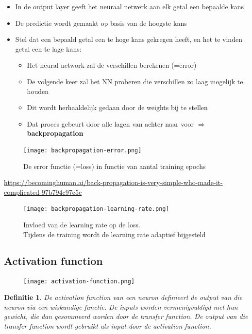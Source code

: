 \documentclass{article}
\newtheorem{theorem}{Definitie}[section]
\begin{document}
\begin{itemize}
    \item In de output layer geeft het neuraal netwerk aan elk getal een bepaalde kans
    \item De predictie wordt gemaakt op basis van de hoogste kans
    \item Stel dat een bepaald getal een te hoge kans gekregen heeft, en het te vinden getal een te lage kans:
    \begin{itemize}
        \item Het neural network zal de verschillen berekenen (=error)
        \item De volgende keer zal het NN proberen die verschillen zo laag mogelijk te houden
        \item Dit wordt herhaaldelijk gedaan door de weights bij te stellen
        \item Dat proces gebeurt door alle lagen van achter naar voor $\Rightarrow$ \textbf{backpropagation}
    \end{itemize}
\end{itemize}

\begin{figure}[H]
    \centering
    \texttt{[image: backpropagation-error.png]}
    \caption{De error functie (=loss) in functie van aantal training epochs}
\end{figure}

\url{https://becominghuman.ai/back-propagation-is-very-simple-who-made-it-complicated-97b794c97e5c}

\begin{figure}[H]
    \centering
    \texttt{[image: backpropagation-learning-rate.png]}
    \caption{Invloed van de learning rate op de loss.\\ Tijdens de training wordt de learning rate adaptief bijgesteld}
\end{figure}

\subsection{Activation function}

\begin{figure}[H]
    \centering
    \texttt{[image: activation-function.png]}
\end{figure}


\begin{theorem}
    De activation function van een neuron definieert de output van die neuron via een wiskundige functie. 
    De inputs worden vermenigvuldigd met hun gewicht, die dan gesommeerd worden door de transfer function. 
    De output van die transfer function wordt gebruikt als input door de activation function.
\end{theorem}
\end{document}
